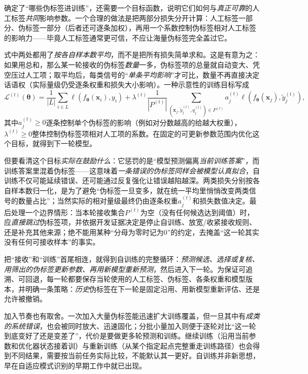 确定了“哪些伪标签进训练”，还需要一个目标函数，说明它们如何与\emph{真正可靠}的人工标签\emph{共同}影响参数。一个合理的做法是把两部分损失分开计算：人工标签一部分、伪标签一部分（后者还可逐条加权），再用一个系数控制伪标签相对人工标签的影响力——毕竟人工标签通常更可信，不应让海量伪标签完全盖过它。

式中两处都用了\emph{按各自样本数平均}，而不是把所有损失简单求和。这是有意为之：如果用总和，那么某一轮接收的伪标签\emph{数量}一多，伪标签项的总量就自动变大、凭空压过人工项；取平均后，每类信号的“\emph{单条平均影响}”才可比，数量不再直接决定话语权（实际量级仍受逐条权重和损失大小影响）。一种示意性的训练目标写成
\begin{equation}
  \mathcal{L}^{(t)}(\bm{\theta})
  =
  \frac{1}{|L|}\sum_{i\in L}\ell\!\left(f_{\bm{\theta}}(\bm{x}_i),y_i\right)
  +
  \lambda^{(t)}
  \frac{1}{|P^{(t)}|}
  \sum_{(\bm{x}_j,\widetilde y_j^{(t)},q_j^{(t)})\in P^{(t)}}
  a_j^{(t)}
  \ell\!\left(f_{\bm{\theta}}(\bm{x}_j),\widetilde y_j^{(t)}\right),
  \label{eq:knowledge-acquisition-self-training-objective}
\end{equation}
其中$a_j^{(t)}\geq0$逐条控制单个伪标签的影响（例如对分数越高的给越大权重），$\lambda^{(t)}\geq0$整体控制伪标签项相对人工项的系数。在固定的可更新参数范围内优化这个目标，就得到下一轮模型。

但要看清这个目标\emph{实际在鼓励什么}：它惩罚的是“模型预测偏离\emph{当前训练答案}”，而训练答案里混着伪标签——这意味着\emph{一条错误的伪标签同样会被模型认真拟合}，自训练不仅可能延续错误、还可能通过反复强化让错误越陷越深。两类损失分别按各自样本数归一化，是为了避免“伪标签一旦变多，就在统一平均里悄悄改变两类信号的数量占比”；当然实际的相对量级最终仍由逐条权重$a_j^{(t)}$和损失数值决定。最后处理一个边界情形：当本轮接收集合$P^{(t)}$为空（没有任何候选达到阈值）时，应\emph{直接跳过}伪标签项，并依据开发证据决定是停止自训练、放宽/收紧接收规则、还是补充其他来源；绝不能用某种“分母为零时记为0”的约定，去掩盖“这一轮其实没有任何可接收样本”的事实。

\Needspace{110mm}
把“接收”和“训练”首尾相连，就得到自训练的完整循环：\emph{预测候选、选择或复核、用筛出的伪标签更新参数、再用新模型重新预测}，然后进入下一轮。为保证可追溯、可回退，每一轮都要保存当轮使用的人工标签、伪标签、各条权重和模型版本，并明确一条策略：\emph{历史}伪标签在下一轮是固定沿用、用新模型重新评估、还是允许被撤销。

加入节奏也有取舍。一次加入大量伪标签能迅速扩大训练覆盖，但一旦其中有\emph{成类的系统错误}，也会被同时放大、迅速固化；分批小量加入则便于逐轮对比“这一轮到底变好了还是变差了”，代价是要做更多轮预测和训练。继续训练（沿用当前参数和优化器状态接着训）与重新训练（从某个指定起点完整重走训练路径）也会得到不同结果，需要按当前任务实际比较，不能默认其一更好。自训练并非新思想，早在自适应模式识别的早期工作中就已出现。

